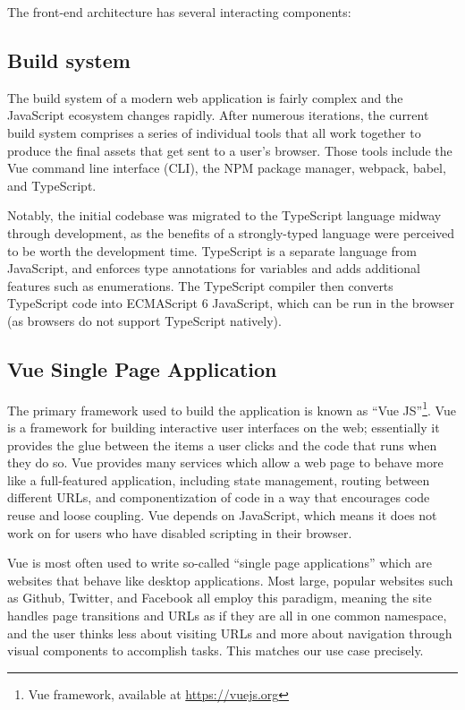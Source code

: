 The front-end architecture has several interacting components:

\hypertarget{mathub-build-system}{%
\subsection{Build system}\label{build-system}}

The build system of a modern web application is fairly complex and the JavaScript ecosystem changes rapidly. After numerous iterations, the current build system comprises a series of individual tools that all work together to produce the final assets that get sent to a user's browser. Those tools include the Vue command line interface (CLI), the NPM package manager, webpack, babel, and TypeScript.

Notably, the initial codebase was migrated to the TypeScript language midway through development, as the benefits of a strongly-typed language were perceived to be worth the development time. TypeScript is a separate language from JavaScript, and enforces type annotations for variables and adds additional features such as enumerations. The TypeScript compiler then converts TypeScript code into ECMAScript 6 JavaScript, which can be run in the browser (as browsers do not support TypeScript natively).

\hypertarget{vue-single-page-application}{%
\subsection{Vue Single Page Application}\label{vue-single-page-application}}

The primary framework used to build the application is known as ``Vue JS''\footnote{Vue framework, available at \url{https://vuejs.org}}. Vue is a framework for building interactive user interfaces on the web; essentially it provides the glue between the items a user clicks and the code that runs when they do so. Vue provides many services which allow a web page to behave more like a full-featured application, including state management, routing between different URLs, and componentization of code in a way that encourages code reuse and loose coupling. Vue depends on JavaScript, which means it does not work on for users who have disabled scripting in their browser.

Vue is most often used to write so-called ``single page applications'' which are websites that behave like desktop applications. Most large, popular websites such as Github, Twitter, and Facebook all employ this paradigm, meaning the site handles page transitions and URLs as if they are all in one common namespace, and the user thinks less about visiting URLs and more about navigation through visual components to accomplish tasks. This matches our use case precisely.


